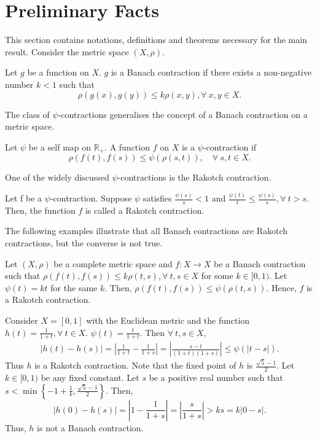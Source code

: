 \documentclass[sn-mathphys-num]{sn-jnl}
\numberwithin{equation}{section}
\begin{document}
\section{Preliminary Facts}\label{prelims}
This section contains notations, definitions and theorems necessary for the main result. Consider the metric space $(X,\rho)$.
\begin{definition}
\cite{rudin1964principles} Let $g$ be a function on $X$. $g$ is a Banach contraction if there exists a non-negative number $k<1$ such that
\begin{equation}
    \nonumber \rho(g(x),g(y))\leq k\rho(x,y), \forall \ x,y\in X.
\end{equation}
\end{definition}
\noindent The class of $\psi$-contractions generalises the concept of a Banach contraction on a metric space.
\begin{definition}
\cite{strobin2015attractors} Let $\psi$ be a self map on $\mathbb{R}_{+}$. A function $f$ on $X$ is a $\psi$-contraction if
\begin{equation}
\rho(f(t),f(s))\leq \psi(\rho(s,t)), \quad \forall\ s,t\in X \nonumber.
\end{equation}
\end{definition}
\noindent One of the widely discussed $\psi$-contractions is the Rakotch contraction.
\begin{definition}
\cite{ri2018new}Let f be a $\psi$-contraction. Suppose $\psi$ satisfies $\frac{\psi(s)}{s}<1$ and $\frac{\psi(t)}{t}\leq\frac{\psi(s)}{s},\forall \ t>s$. Then, the function $f$ is called a Rakotch contraction.
\end{definition}
\noindent The following examples illustrate that all Banach contractions are Rakotch contractions, but the converse is not true.
\begin{example}
    Let $(X,\rho)$ be a complete metric space and $f:X\rightarrow X$ be a Banach contraction such that $\rho(f(t),f(s))\leq k\rho(t,s), \forall~t,s\in X$ for some $k \in [0,1)$. Let $\psi(t)=kt$ for the same $k$. Then, $\rho(f(t),f(s))\leq \psi(\rho(t,s))$. Hence, $f$ is a Rakotch contraction.
\end{example}
\begin{example}
    Consider $X=[0,1]$ with the Euclidean metric and the function $h(t)=\frac{1}{1+t}, \forall \ t\in X$. $\psi(t)=\frac{t}{1+t}$. Then $\forall\ t,s\in X$,
    \begin{eqnarray*}
        |h(t)-h(s)|=|\frac{1}{1+t}-\frac{1}{1+s}|=|\frac{s-t}{(1+t)(1+s)}|\leq \psi(|t-s|).
    \end{eqnarray*}
    Thus $h$ is a Rakotch contraction. Note that the fixed point of $h$ is $\frac{\sqrt{5}-1}{2}$. Let\\ $k\in[0,1)$ be any fixed constant. Let $s$ be a positive real number such that $s<\min\left\{-1+\frac{1}{k},\frac{\sqrt{5}-1}{2}\right\}$. Then,
    $$|h(0)-h(s)|=|1-\frac{1}{1+s}|=|\frac{s}{1+s}|>ks=k|0-s|.$$
    Thus, $h$ is not a Banach contraction.
\end{example}
\end{document}
